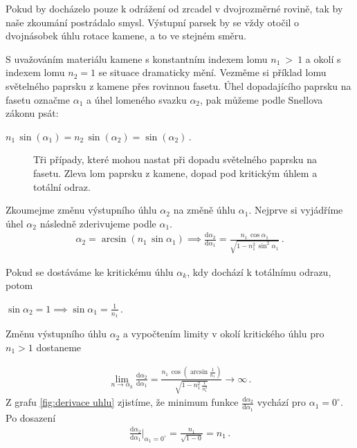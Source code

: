 Pokud by docházelo pouze k odrážení od zrcadel v dvojrozměrné rovině, tak by naše zkoumání postrádalo smysl. Výstupní parsek by se vždy otočil o dvojnásobek úhlu rotace kamene, a to ve stejném směru. 

S uvažováním materiálu kamene s konstantním indexem lomu $ n_1~>~1 $ a okolí s indexem lomu $ n_2 = 1 $ se situace dramaticky mění. Vezměme si příklad lomu světelného paprsku z kamene přes rovinnou fasetu. Úhel dopadajícího paprsku na fasetu označme $\alpha_1$ a úhel lomeného svazku $\alpha_2$, pak můžeme podle Snellova zákonu psát:

\begin{center}
$n_1\,\sin(\alpha_1) = n_2\,\sin(\alpha_2) = \sin(\alpha_2)\,.$
\end{center}

\begin{figure}[h!]
\begin{center}
\scalebox{.9}{ }
\end{center}
\caption{Tři případy, které mohou nastat při dopadu světelného paprsku na fasetu. Zleva lom paprsku z kamene, dopad pod kritickým úhlem a totální odraz.}
\label{fig:lom ven }
\end{figure}

Zkoumejme změnu výstupního úhlu $\alpha_2$ na změně úhlu $\alpha_1$. Nejprve si vyjádříme úhel $\alpha_2$ následně zderivujeme podle $\alpha_1$. 
\begin{eqnarray}
\alpha_2 = \arcsin(n_1\,\sin\alpha_1) \implies \frac{\mathrm{d}\alpha_2}{\mathrm{d}\alpha_1}= \frac{n_1\,\cos\alpha_1}{\sqrt{1-n_1^2\,\sin^2\alpha_1}}\,.
\label{eq:derivace uhlu}  
\end{eqnarray}

Pokud se dostáváme ke kritickému úhlu $\alpha_k$, kdy dochází k totálnímu odrazu, potom
\begin{center}
 $	\sin\alpha_2 = 1 \implies \sin\alpha_1 = \frac{1}{n_1}\,. $
\end{center}

Změnu výstupního úhlu $\alpha_2$ a vypočtením limity v okolí kritického úhlu pro $ n_1>1$ dostaneme 

\begin{eqnarray}
\lim_{n \to \alpha_k}\frac{\mathrm{d}\alpha_2}{\mathrm{d}\alpha_1} = \frac{n_1\,\cos(\arcsin\frac{1}{n_1})}{\sqrt{1-n_1^2\,\frac{1}{n_1^2}}} \to \infty\,.
\label{eq:zmena velikosti posunu}  
\end{eqnarray}
Z grafu \ref{fig:derivace uhlu} zjistíme, že minimum funkce $\frac{\mathrm{d}\alpha_2}{\mathrm{d}\alpha_1}$ vychází pro $ \alpha_1 = 0^\circ $. Po dosazení
\begin{eqnarray}
{\frac{\mathrm{d}\alpha_2}{\mathrm{d}\alpha_1}}\biggr\rvert_{\alpha_1 = 0^\circ}= \frac{n_1}{\sqrt{1-0}} = n_1\,.
\end{eqnarray}


